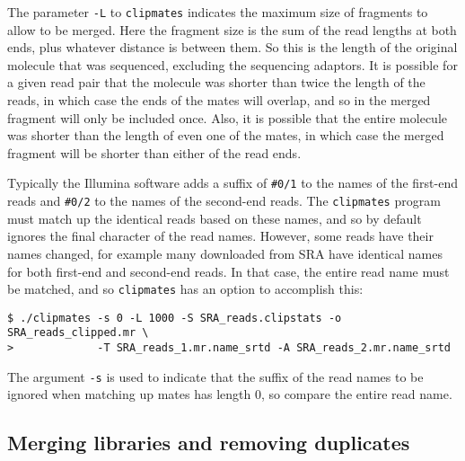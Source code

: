 \documentclass[10pt]{article}
\newcommand{\prog}[1]{\texttt{#1}}
\newcommand{\lit}[1]{\texttt{#1}}
\newcommand{\op}[1]{\texttt{#1}}
\begin{document}
The parameter \op{-L} to \prog{clipmates} indicates the maximum size
of fragments to allow to be merged. Here the fragment size is the sum
of the read lengths at both ends, plus whatever distance is between
them. So this is the length of the original molecule that was
sequenced, excluding the sequencing adaptors. It is possible for a
given read pair that the molecule was shorter than twice the length of
the reads, in which case the ends of the mates will overlap, and so in
the merged fragment will only be included once. Also, it is possible
that the entire molecule was shorter than the length of even one of
the mates, in which case the merged fragment will be shorter than
either of the read ends.

Typically the Illumina software adds a suffix of \lit{\#0/1} to the
names of the first-end reads and \lit{\#0/2} to the names of the
second-end reads. The \prog{clipmates} program must match up the
identical reads based on these names, and so by default ignores the
final character of the read names. However, some reads have their
names changed, for example many downloaded from SRA have identical
names for both first-end and second-end reads. In that case, the
entire read name must be matched, and so \prog{clipmates} has an
option to accomplish this:
\begin{verbatim}
$ ./clipmates -s 0 -L 1000 -S SRA_reads.clipstats -o SRA_reads_clipped.mr \
>             -T SRA_reads_1.mr.name_srtd -A SRA_reads_2.mr.name_srtd
\end{verbatim}
The argument \lit{-s} is used to indicate that the suffix of the read
names to be ignored when matching up mates has length 0, so compare
the entire read name.

\subsection{Merging libraries and removing duplicates}
\label{sec:mapping}
\end{document}
